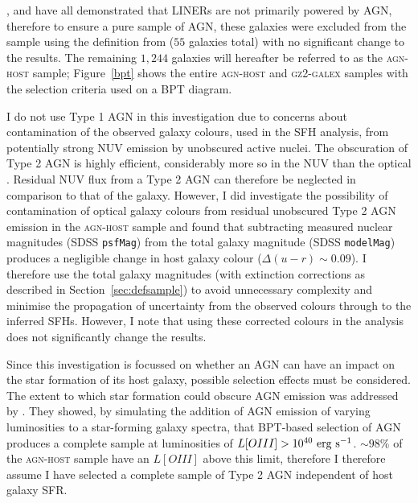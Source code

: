 \cite{Sarzi10}, \cite{yan12} and \cite{Singh13} have all demonstrated that LINERs are not primarily powered by AGN, therefore to ensure a pure sample of AGN, these galaxies were excluded from the sample using the definition from \citet[][]{kewley06} ($55$ galaxies total) with no significant change to the results. The remaining $1,244$ galaxies will hereafter be referred to as the \textsc{agn-host} sample; Figure~\ref{bpt} shows the entire \textsc{agn-host} and \textsc{gz2-galex} samples with the selection criteria used on a BPT diagram.

I do not use Type 1 AGN in this investigation due to concerns about contamination of the observed galaxy colours, used in the SFH analysis, from potentially strong NUV emission by unobscured active nuclei. The obscuration of Type 2 AGN is highly efficient, considerably more so in the NUV than the optical \citep{Simmons11}. Residual NUV flux from a Type 2 AGN can therefore be neglected in comparison to that of the galaxy. However, I did investigate the possibility of contamination of optical galaxy colours from residual unobscured Type 2 AGN emission in the \textsc{agn-host} sample and found that subtracting measured nuclear magnitudes (SDSS {\tt psfMag}) from the total galaxy magnitude (SDSS {\tt modelMag}) produces a negligible change in host galaxy colour ($\Delta(u-r) \sim 0.09$). I therefore use the total galaxy magnitudes (with extinction corrections as described in Section~\ref{sec:defsample}) to avoid unnecessary complexity and minimise the propagation of uncertainty from the observed colours through to the inferred SFHs. However, I note that using these corrected colours in the analysis does not significantly change the results.

Since this investigation is focussed on whether an AGN can have an impact on the star formation of its host galaxy, possible selection effects must be considered. The extent to which star formation could obscure AGN emission was addressed by \cite{schawinski10a}. They showed, by simulating the addition of AGN emission of varying luminosities to a star-forming galaxy spectra, that BPT-based selection of AGN produces a complete sample at luminosities of $L[OIII] > 10^{40}~\rm{erg~s}^{-1}$. $\sim98\%$ of the \textsc{agn-host} sample have an $L[OIII]$ above this limit, therefore I therefore assume I have selected a complete sample of Type 2 AGN independent of host galaxy SFR. 

